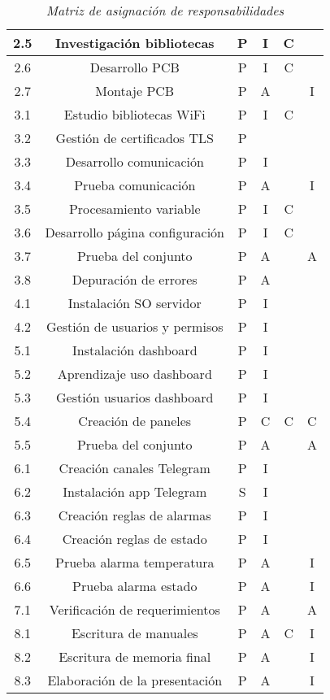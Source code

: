 \documentclass[11pt]{proyecto}
\begin{document}
\begin{table}[htpb]
{\begin{tabular}{|c|c|c|c|c|c|}
 2.5&Investigación bibliotecas  & P  & I & C &\\ \hline
 2.6&Desarrollo PCB  & P  & I & C &\\ \hline
 2.7&Montaje PCB  & P  & A &  & I\\ \hline
 3.1&Estudio bibliotecas WiFi  & P & I & C &\\ \hline
 3.2&Gestión de certificados TLS  & P &  &  &\\ \hline
 3.3&Desarrollo comunicación  & P & I &  &\\ \hline
 3.4&Prueba comunicación  & P & A &  & I\\ \hline
 3.5&Procesamiento variable  & P  & I & C &\\ \hline
 3.6&Desarrollo página configuración & P  & I & C &\\ \hline
 3.7&Prueba del conjunto  & P & A &  & A\\ \hline
 3.8&Depuración de errores  & P & A &  &\\ \hline
 4.1&Instalación SO servidor  & P & I &  &\\ \hline
 4.2&Gestión de usuarios y permisos & P & I &  &\\ \hline
 5.1&Instalación dashboard  & P & I &  &\\ \hline 
 5.2&Aprendizaje uso dashboard  & P & I &  &\\ \hline
 5.3&Gestión usuarios dashboard  & P & I &  &\\ \hline
 5.4&Creación de paneles  & P & C & C & C\\ \hline
 5.5&Prueba del conjunto  & P & A &  & A\\ \hline
 6.1&Creación canales Telegram  & P & I &  &\\ \hline
 6.2&Instalación app Telegram & S & I &  &  \\ \hline
 6.3&Creación reglas de alarmas & P & I &  &\\ \hline
 6.4&Creación reglas de estado & P & I &  &\\ \hline
 6.5&Prueba alarma temperatura & P & A &  & I\\ \hline
 6.6&Prueba alarma estado & P & A &  & I \\ \hline
 7.1&Verificación de requerimientos & P & A &  & A\\ \hline
 8.1&Escritura de manuales & P & A & C & I\\ \hline
 8.2&Escritura de memoria final & P & A &  & I\\ \hline
 8.3&Elaboración de la presentación & P & A &  & I\\ \hline

\end{tabular}%
}
\vspace{.5cm}
\caption{\textit{Matriz de asignación de responsabilidades}}
\label{tab:resp}
\end{table}
\end{document}
